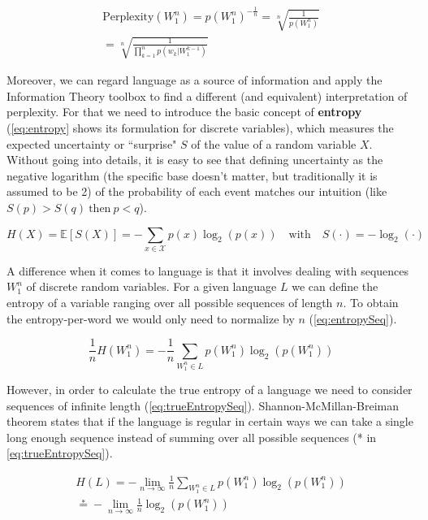 \begin{equation} \label{eq:pp}
	\begin{gathered}
		\text{Perplexity}(W_1^n) = p(W_1^n)^{-\frac{1}{n}} = \sqrt[n]{\frac{1}{p(W_1^n)}} \\
		= \sqrt[n]{\frac{1}{\prod_{k=1}^{n} p(w_k|W_{1}^{k-1})}}
	\end{gathered}
\end{equation}

Moreover, we can regard language as a source of information and apply the Information Theory toolbox to find a different (and equivalent) interpretation of perplexity. For that we need to introduce the basic concept of \textbf{entropy} (\autoref{eq:entropy} shows its formulation for discrete variables), which measures the expected uncertainty or ``surprise" $S$ of the value of a random variable $X$. Without going into details, it is easy to see that defining uncertainty as the negative logarithm (the specific base doesn't matter, but traditionally it is assumed to be 2) of the probability of each event matches our intuition (like $S(p)>S(q) \ \text{then} \ p<q$).

\begin{equation} \label{eq:entropy}
	H(X)=\mathbb{E}[S(X)]=-\sum_{x \in \mathcal{X}}p(x)\log_2(p(x)) \quad \text{with} \quad S(\cdot)=-\log_2(\cdot)
\end{equation}

A difference when it comes to language is that it involves dealing with sequences $W_1^n$ of discrete random variables. For a given language $L$ we can define the entropy of a variable ranging over all possible sequences of length $n$. To obtain the entropy-per-word we would only need to normalize by $n$ (\autoref{eq:entropySeq}).

\begin{equation} \label{eq:entropySeq}
	\frac{1}{n} H(W_1^n) = -\frac{1}{n}\sum_{W_1^n \in L}p(W_1^n)\log_2(p(W_1^n))
\end{equation}

However, in order to calculate the true entropy of a language we need to consider sequences of infinite length (\autoref{eq:trueEntropySeq}). Shannon-McMillan-Breiman theorem states that if the language is regular in certain ways we can take a single long enough sequence instead of summing over all possible sequences (* in \autoref{eq:trueEntropySeq}).

\begin{equation} \label{eq:trueEntropySeq}
	\begin{gathered}
		H(L) = -\lim\limits_{n \rightarrow \infty}\frac{1}{n}\sum_{W_1^n \in L}p(W_1^n)\log_2(p(W_1^n))\\
		\stackrel{*}{=} -\lim\limits_{n \rightarrow \infty}\frac{1}{n}\log_2(p(W_1^n))
	\end{gathered}
\end{equation}

